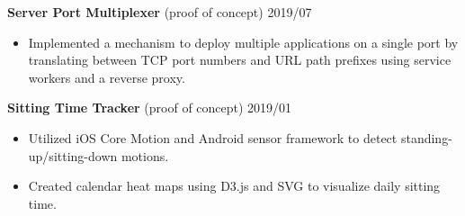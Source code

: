\documentclass[12pt]{article}
\begin{document}
\textbf{Server Port Multiplexer} (proof of concept) \hfill 2019/07
\begin{itemize}
\item Implemented a mechanism to deploy multiple applications on a single port by translating between TCP port numbers and URL path prefixes using service workers and a reverse proxy.
\end{itemize}

\textbf{Sitting Time Tracker} (proof of concept) \hfill 2019/01
\begin{itemize}
\item Utilized iOS Core Motion and Android sensor framework to detect standing-up/sitting-down motions.
\item Created calendar heat maps using D3.js and SVG to visualize daily sitting time.
\end{itemize}
\end{document}

